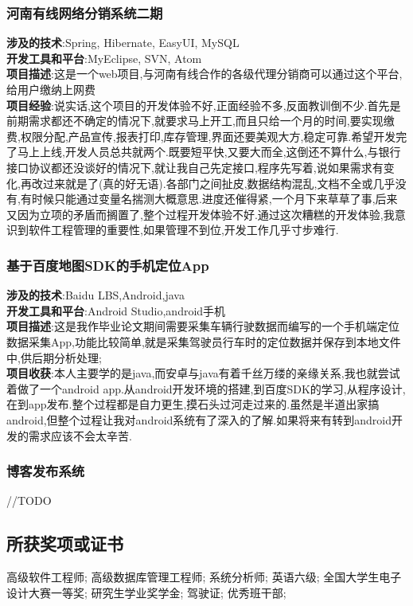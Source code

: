 \documentclass{ctexart}
\begin{document}
\subsubsection{河南有线网络分销系统二期\\}
\label{sec-1-4-2}
\noindent \textbf{涉及的技术}:Spring, Hibernate, EasyUI, MySQL\\
\textbf{开发工具和平台}:MyEclipse, SVN, Atom\\
\textbf{项目描述}:这是一个web项目,与河南有线合作的各级代理分销商可以通过这个平台,给用户缴纳上网费\\
\textbf{项目经验}:说实话,这个项目的开发体验不好,正面经验不多,反面教训倒不少.首先是前期需求都还不确定的情况下,就要求马上开工,而且只给一个月的时间,要实现缴费,权限分配,产品宣传,报表打印,库存管理,界面还要美观大方,稳定可靠.希望开发完了马上上线,开发人员总共就两个.既要短平快,又要大而全,这倒还不算什么,与银行接口协议都还没谈好的情况下,就让我自己先定接口,程序先写着,说如果需求有变化,再改过来就是了(真的好无语).各部门之间扯皮,数据结构混乱,文档不全或几乎没有,有时候只能通过变量名揣测大概意思.进度还催得紧,一个月下来草草了事,后来又因为立项的矛盾而搁置了,整个过程开发体验不好.通过这次糟糕的开发体验,我意识到软件工程管理的重要性,如果管理不到位,开发工作几乎寸步难行.
\subsubsection{基于百度地图SDK的手机定位App\\}
\label{sec-1-4-3}
\noindent \textbf{涉及的技术}:Baidu LBS,Android,java\\
\textbf{开发工具和平台}:Android Studio,android手机\\
\textbf{项目描述}:这是我作毕业论文期间需要采集车辆行驶数据而编写的一个手机端定位数据采集App,功能比较简单,就是采集驾驶员行车时的定位数据并保存到本地文件中,供后期分析处理;\\
\textbf{项目收获}:本人主要学的是java,而安卓与java有着千丝万缕的亲缘关系,我也就尝试着做了一个android app.从android开发环境的搭建,到百度SDK的学习,从程序设计,在到app发布.整个过程都是自力更生,摸石头过河走过来的.虽然是半道出家搞android,但整个过程让我对android系统有了深入的了解.如果将来有转到android开发的需求应该不会太辛苦.\\
\subsubsection{博客发布系统 \\}
\label{sec-1-4-4}
//TODO
\subsection{所获奖项或证书}
\label{sec-1-5}
高级软件工程师;
高级数据库管理工程师;
系统分析师;
英语六级;
全国大学生电子设计大赛一等奖;
研究生学业奖学金;
驾驶证;
优秀班干部;
\end{document}
